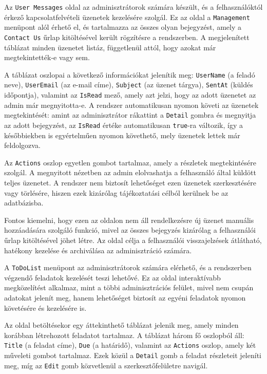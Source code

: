 Az \texttt{User Messages} oldal az adminisztrátorok számára készült, és a felhasználóktól érkező kapcsolatfelvételi üzenetek kezelésére szolgál. Ez az oldal a \texttt{Management} menüpont alól érhető el, és tartalmazza az összes olyan bejegyzést, amely a \texttt{Contact Us} űrlap kitöltésével került rögzítésre a rendszerben. A megjelenített táblázat minden üzenetet listáz, függetlenül attól, hogy azokat már megtekintették-e vagy sem.

A táblázat oszlopai a következő információkat jelenítik meg: \texttt{UserName} (a feladó neve), \texttt{UserEmail} (az e-mail címe), \texttt{Subject} (az üzenet tárgya), \texttt{SentAt} (küldés időpontja), valamint az \texttt{IsRead} mező, amely azt jelzi, hogy az adott üzenetet az admin már megnyitotta-e. A rendszer automatikusan nyomon követi az üzenetek megtekintését: amint az adminisztrátor rákattint a \texttt{Detail} gombra és megnyitja az adott bejegyzést, az \texttt{IsRead} értéke automatikusan \texttt{true}-ra változik, így a későbbiekben is egyértelműen nyomon követhető, mely üzenetek lettek már feldolgozva.

Az \texttt{Actions} oszlop egyetlen gombot tartalmaz, amely a részletek megtekintésére szolgál. A megnyitott nézetben az admin elolvashatja a felhasználó által küldött teljes üzenetet. A rendszer nem biztosít lehetőséget ezen üzenetek szerkesztésére vagy törlésére, hiszen ezek kizárólag tájékoztatási célból kerülnek be az adatbázisba.

Fontos kiemelni, hogy ezen az oldalon nem áll rendelkezésre új üzenet manuális hozzáadására szolgáló funkció, mivel az összes bejegyzés kizárólag a felhasználói űrlap kitöltésével jöhet létre. Az oldal célja a felhasználói visszajelzések átlátható, hatékony kezelése és archiválása az adminisztráció számára.

A \texttt{ToDoList} menüpont az adminisztrátorok számára elérhető, és a rendszerben végzendő feladatok kezelését teszi lehetővé. Ez az oldal interaktívabb megközelítést alkalmaz, mint a többi adminisztrációs felület, mivel nem csupán adatokat jelenít meg, hanem lehetőséget biztosít az egyéni feladatok nyomon követésére és kezelésére is.

Az oldal betöltésekor egy áttekinthető táblázat jelenik meg, amely minden korábban létrehozott feladatot tartalmaz. A táblázat három fő oszlopból áll: \texttt{Title} (a feladat címe), \texttt{Due} (a határidő), valamint az \texttt{Actions} oszlop, amely két műveleti gombot tartalmaz. Ezek közül a \texttt{Detail} gomb a feladat részleteit jeleníti meg, míg az \texttt{Edit} gomb közvetlenül a szerkesztőfelületre navigál.

